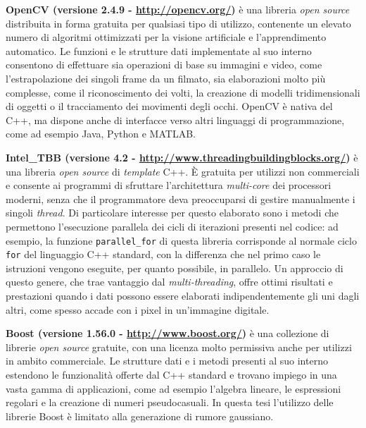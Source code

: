\documentclass[12pt,a4paper,oneside]{article}
\begin{document}
\noindent\textbf{\gls{OpenCV} (versione 2.4.9 - \url{http://opencv.org/})} è una libreria \textit{open source} distribuita in forma gratuita per qualsiasi tipo di utilizzo, contenente un elevato numero di algoritmi ottimizzati per la visione artificiale e l'apprendimento automatico. Le funzioni e le strutture dati implementate al suo interno consentono di effettuare sia operazioni di base su immagini e video, come l'estrapolazione dei singoli frame da un filmato, sia elaborazioni molto più complesse, come il riconoscimento dei volti, la creazione di modelli tridimensionali di oggetti o il tracciamento dei movimenti degli occhi. \gls{OpenCV} è nativa del \mbox{C++}, ma dispone anche di interfacce verso altri linguaggi di programmazione, come ad esempio \mbox{Java}, \mbox{Python} e \mbox{MATLAB}.
\newline

\noindent\textbf{\gls{Intel_TBB} (versione 4.2 - \url{http://www.threadingbuildingblocks.org/})} è una libreria \textit{open source} di \textit{template} \mbox{C++}. È gratuita per utilizzi non commerciali e consente ai programmi di sfruttare l'architettura \textit{multi-core} dei processori moderni, senza che il programmatore deva preoccuparsi di gestire manualmente i singoli \textit{thread}. Di particolare interesse per questo elaborato sono i metodi che permettono l'esecuzione parallela dei cicli di iterazioni presenti nel codice: ad esempio, la funzione \texttt{parallel\_for} di questa libreria corrisponde al normale ciclo \texttt{for} del linguaggio \mbox{C++} standard, con la differenza che nel primo caso le istruzioni vengono eseguite, per quanto possibile, in parallelo. Un approccio di questo genere, che trae vantaggio dal \textit{multi-threading}, offre ottimi risultati e prestazioni quando i dati possono essere elaborati indipendentemente gli uni dagli altri, come spesso accade con i pixel in un'immagine digitale.
\newline

\noindent\textbf{Boost (versione 1.56.0 - \url{http://www.boost.org/})} è una collezione di librerie \textit{open source} gratuite, con una licenza molto permissiva anche per utilizzi in ambito commerciale. Le strutture dati e i metodi presenti al suo interno estendono le funzionalità offerte dal \mbox{C++} standard e trovano impiego in una vasta gamma di applicazioni, come ad esempio l'algebra lineare, le espressioni regolari e la creazione di numeri pseudocasuali. In questa tesi l'utilizzo delle librerie Boost è limitato alla generazione di rumore gaussiano.
\end{document}
